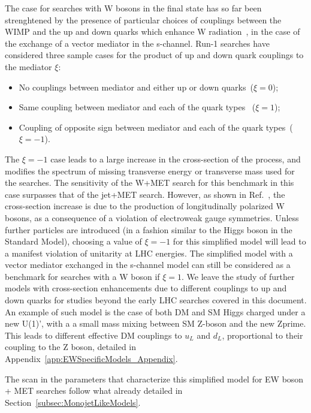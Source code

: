 The case for searches with W bosons in the final state has so far been strenghtened by the
presence of particular choices of couplings between the WIMP and the up and
down quarks which enhance W radiation~\cite{Bai:2012xg}, in the case of the exchange
of a vector mediator in the s-channel.
Run-1 searches have considered three sample cases for the product of
up and down quark couplings to the mediator $\xi$:
\begin{itemize}
 \item No couplings between mediator and either up or down quarks~($\xi=0$);
 \item Same coupling between mediator and each of the quark types~ ($\xi=1$);
 \item Coupling of opposite sign between mediator and each of the quark types~($\xi=-1$).
\end{itemize}
The $\xi=-1$ case leads to a large increase in the cross-section of the process,
and modifies the spectrum of missing transverse energy or
transverse mass used for the searches. The sensitivity of the W+MET search for
this benchmark in this case surpasses that of the jet+MET search.
However, as shown in Ref.~\cite{Bell:2015sza}, the cross-section increase is due
to the production of longitudinally polarized W bosons,
as a consequence of a violation of electroweak gauge symmetries. Unless further
particles are introduced (in a fashion similar
to the Higgs boson in the Standard Model), choosing a value of $\xi=-1$
for this simplified model will lead to a manifest violation of unitarity at LHC energies.
The simplified model with a vector mediator exchanged in the s-channel model
can still be considered as a benchmark for searches with a W boson if $\xi=1$.
We leave the study of further models with cross-section enhancements due
to different couplings to up and down quarks for studies beyond the early LHC searches
covered in this document.
An example of such model is the case of both DM and SM Higgs charged under a new U(1)',
with a a small mass mixing between SM Z-boson and the new Zprime. This leads
to different effective DM couplings to $u_L$ and $d_L$, proportional to
their coupling to the Z boson, detailed in Appendix~\ref{app:EWSpecificModels_Appendix}.

The scan in the parameters that characterize this simplified model for EW boson + MET
searches follow what already detailed in Section~\ref{subsec:MonojetLikeModels}.

